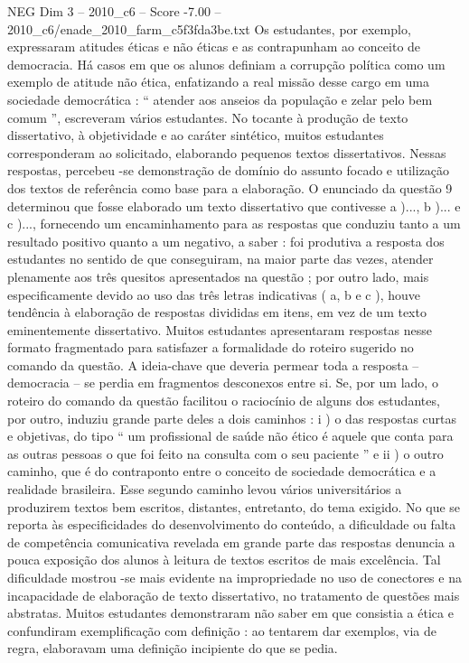 \begin{textsample}{NEG Dim 3 – 2010\_c6 – Score -7.00 – 2010\_c6/enade\_2010\_farm\_c5f3fda3be.txt}
Os estudantes, por exemplo, expressaram atitudes éticas e não éticas e as contrapunham ao conceito de democracia.
Há casos em que os alunos definiam a corrupção política como um exemplo de atitude não ética, enfatizando a real missão desse cargo em uma sociedade democrática : “ atender aos anseios da população e zelar pelo bem comum ”, escreveram vários estudantes.
No tocante à produção de texto dissertativo, à objetividade e ao caráter sintético, muitos estudantes corresponderam ao solicitado, elaborando pequenos textos dissertativos.
Nessas respostas, percebeu -se demonstração de domínio do assunto focado e utilização dos textos de referência como base para a elaboração.
O enunciado da questão 9 determinou que fosse elaborado um texto dissertativo que contivesse a )..., b )... e c )..., fornecendo um encaminhamento para as respostas que conduziu tanto a um resultado positivo quanto a um negativo, a saber : foi produtiva a resposta dos estudantes no sentido de que conseguiram, na maior parte das vezes, atender plenamente aos três quesitos apresentados na questão ; por outro lado, mais especificamente devido ao uso das três letras indicativas ( a, b e c ), houve tendência à elaboração de respostas divididas em itens, em vez de um texto eminentemente dissertativo.
Muitos estudantes apresentaram respostas nesse formato fragmentado para satisfazer a formalidade do roteiro sugerido no comando da questão.
A ideia-chave que deveria permear toda a resposta – democracia – se perdia em fragmentos desconexos entre si.
Se, por um lado, o roteiro do comando da questão facilitou o raciocínio de alguns dos estudantes, por outro, induziu grande parte deles a dois caminhos : i ) o das respostas curtas e objetivas, do tipo “ um profissional de saúde não ético é aquele que conta para as outras pessoas o que foi feito na consulta com o seu paciente ” e ii ) o outro caminho, que é do contraponto entre o conceito de sociedade democrática e a realidade brasileira.
Esse segundo caminho levou vários universitários a produzirem textos bem escritos, distantes, entretanto, do tema exigido.
No que se reporta às especificidades do desenvolvimento do conteúdo, a dificuldade ou falta de competência comunicativa revelada em grande parte das respostas denuncia a pouca exposição dos alunos à leitura de textos escritos de mais excelência.
Tal dificuldade mostrou -se mais evidente na impropriedade no uso de conectores e na incapacidade de elaboração de texto dissertativo, no tratamento de questões mais abstratas.
Muitos estudantes demonstraram não saber em que consistia a ética e confundiram exemplificação com definição : ao tentarem dar exemplos, via de regra, elaboravam uma definição incipiente do que se pedia.

\end{textsample}
